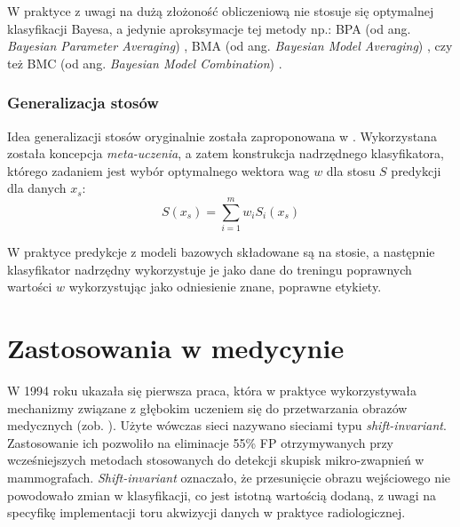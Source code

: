 W praktyce z uwagi na dużą złożoność obliczeniową nie stosuje się optymalnej klasyfikacji Bayesa, a jedynie aproksymacje tej metody np.: BPA (od ang. \textit{Bayesian Parameter Averaging}) \cite{BPA}, BMA (od ang. \textit{Bayesian Model Averaging}) \cite{BMA}, czy też BMC (od ang. \textit{Bayesian Model Combination}) \cite{BMC}.

\subsubsection{Generalizacja stosów}
Idea generalizacji stosów oryginalnie została zaproponowana w \cite{Wolpert92stackedgeneralization}. Wykorzystana została koncepcja \textit{meta-uczenia}, a zatem konstrukcja nadrzędnego klasyfikatora, którego zadaniem jest wybór optymalnego wektora wag $w$ dla stosu $S$ predykcji dla danych $x_s$:
\begin{equation}
S(x_s) = \sum_{i=1}^{m}w_i S_i(x_s)
\end{equation}

W praktyce predykcje z modeli bazowych składowane są na stosie, a następnie klasyfikator nadrzędny wykorzystuje je jako dane do treningu poprawnych wartości $w$ wykorzystując jako odniesienie znane, poprawne etykiety.
 

\section{Zastosowania w medycynie}

W 1994 roku ukazała się pierwsza praca, która w praktyce wykorzystywała mechanizmy związane z głębokim uczeniem się do przetwarzania obrazów medycznych (zob. \cite{Zhang1994}). Użyte wówczas sieci nazywano sieciami typu \textit{shift-invariant}. Zastosowanie ich pozwoliło na eliminacje 55\% FP otrzymywanych przy wcześniejszych metodach stosowanych do detekcji skupisk mikro-zwapnień w mammografach. \textit{Shift-invariant} oznaczało, że przesunięcie obrazu wejściowego nie powodowało zmian w klasyfikacji, co jest istotną wartością dodaną, z uwagi na specyfikę implementacji toru akwizycji danych w praktyce radiologicznej.

